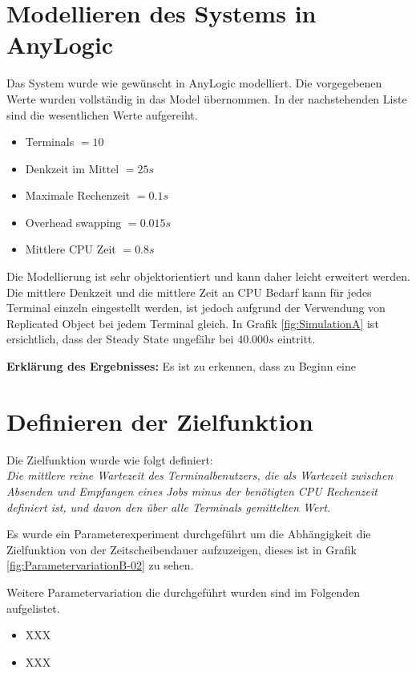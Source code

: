 \documentclass[
a4paper,   
headsepline, 
fleqn,     
11pt
]{scrartcl}
\begin{document}

\section{Modellieren des Systems in AnyLogic}
Das System wurde wie gewünscht in AnyLogic modelliert. Die vorgegebenen Werte wurden vollständig in das Model übernommen. In der nachstehenden Liste sind die wesentlichen Werte aufgereiht. 

\begin{itemize}
	\item Terminals $=10$
	\item Denkzeit im Mittel $=25s$
	\item Maximale Rechenzeit $=0.1s$
	\item Overhead swapping $=0.015s$
	\item Mittlere CPU Zeit $=0.8s$
\end{itemize}

Die Modellierung ist sehr objektorientiert und kann daher leicht erweitert werden. Die mittlere Denkzeit und die mittlere Zeit an CPU Bedarf kann für jedes Terminal einzeln eingestellt werden, ist jedoch aufgrund der Verwendung von Replicated Object bei jedem Terminal gleich. In Grafik \ref{fig:SimulationA} ist ersichtlich, dass der Steady State ungefähr bei $40.000s$ eintritt.

\textbf{Erklärung des Ergebnisses:} Es ist zu erkennen, dass zu Beginn eine 

\section{Definieren der Zielfunktion}
\label{sec:DefinitionTargetFunction}
Die Zielfunktion wurde wie folgt definiert: \\
\textit{Die mittlere reine Wartezeit des Terminalbenutzers, die als Wartezeit zwischen Absenden und Empfangen eines Jobs minus der benötigten CPU Rechenzeit definiert ist, und davon den über alle Terminals gemittelten Wert.}

Es wurde ein Parameterexperiment durchgeführt um die Abhängigkeit die Zielfunktion von der Zeitscheibendauer aufzuzeigen, dieses ist in Grafik \ref{fig:ParametervariationB-02} zu sehen.

Weitere Parametervariation die durchgeführt wurden sind im Folgenden aufgelistet.

\begin{itemize}
	\item XXX
	\item XXX
\end{itemize}
\end{document}
